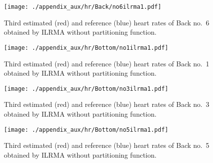\begin{figure}[tb]
\centering
\texttt{[image: ./appendix\_aux/hr/Back/no6ilrma1.pdf]}
\caption{Third estimated (red) and reference (blue) heart rates of Back no.~6 obtained by ILRMA without partitioning function.}
\end{figure}

\begin{figure}[tb]
\centering
\texttt{[image: ./appendix\_aux/hr/Bottom/no1ilrma1.pdf]}
\caption{Third estimated (red) and reference (blue) heart rates of Back no.~1 obtained by ILRMA without partitioning function.}
\end{figure}

\begin{figure}[tb]
\centering
\texttt{[image: ./appendix\_aux/hr/Bottom/no3ilrma1.pdf]}
\caption{Third estimated (red) and reference (blue) heart rates of Back no.~3 obtained by ILRMA without partitioning function.}
\end{figure}

\begin{figure}[tb]
\centering
\texttt{[image: ./appendix\_aux/hr/Bottom/no5ilrma1.pdf]}
\caption{Third estimated (red) and reference (blue) heart rates of Back no.~5 obtained by ILRMA without partitioning function.}
\end{figure}
